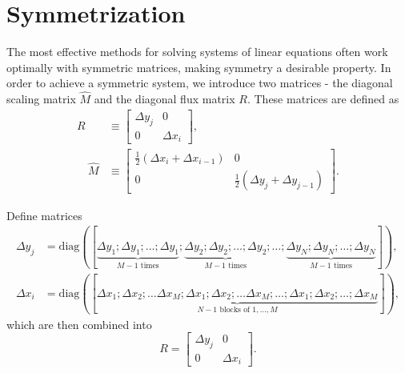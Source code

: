 \documentclass{article}
\numberwithin{equation}{section}
\begin{document}
\section{Symmetrization}\label{sec:symmetrization}

The most effective methods for solving systems of linear equations often work optimally with symmetric matrices, making symmetry a desirable property. In order to achieve a symmetric system, we introduce two matrices - the diagonal scaling matrix $\hat{M}$ and the diagonal flux matrix $R$. These matrices are defined as
\begin{align*}
R &\equiv\left[\begin{array}{cc}
\Delta y_j & 0 \\
0 & \Delta x_i
\end{array}\right], \\
\quad \hat{M} & \equiv\left[\begin{array}{cc}
\frac{1}{2}\left(\Delta x_i+\Delta x_{i-1}\right) & 0 \\
0 & \frac{1}{2}\left(\Delta y_j+\Delta y_{j-1}\right)
\end{array}\right].
\end{align*}

Define matrices 
\begin{equation*}
\begin{aligned}
	\Delta y_j&=\text{diag}([\underbrace{\Delta y_1; \Delta y_1; \dotsc;\Delta y_1}_{M-1\text{ times}}; \underbrace{\Delta y_2; \Delta y_2; \dotsc;\Delta y_2}_{M-1\text{ times}};\dotsc;\underbrace{\Delta y_N; \Delta y_N; \dotsc;\Delta y_N}_{M-1\text{ times}}]),\\
	\Delta x_i&=\text{diag}([\underbrace{\Delta x_1; \Delta x_2;\dotsc\Delta x_M;\Delta x_1; \Delta x_2;\dotsc\Delta x_M; \dotsc;\Delta x_1; \Delta x_2;\dotsc;\Delta x_M}_{N-1\text{ blocks of } 1,\dotsc,M}]),
\end{aligned}
\end{equation*}
which are then combined into
\begin{equation*}
R =\left[\begin{array}{cc}
\Delta y_j & 0 \\
0 & \Delta x_i
\end{array}\right].
\end{equation*}
\end{document}
